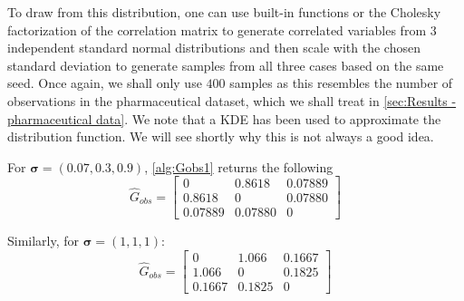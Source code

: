 \documentclass[../Thesis.tex]{subfiles}
\begin{document}

To draw from this distribution, one can use built-in functions or the Cholesky factorization of the correlation matrix to generate correlated variables from $3$ independent standard normal distributions and then scale with the chosen standard deviation to generate samples from all three cases based on the same seed. Once again, we shall only use $400$ samples as this resembles the number of observations in the pharmaceutical dataset, which we shall treat in \autoref{sec:Results - pharmaceutical data}. We note that a KDE has been used to approximate the distribution function. We will see shortly why this is not always a good idea.


For $\boldsymbol\sigma = (0.07, 0.3, 0.9)$, \autoref{alg:Gobs1} returns the following
\begin{equation} \label{eq:s small G_dir}
    \hat{G}_{obs} =
    \begin{bmatrix}
        0       & 0.8618  & 0.07889 \\
        0.8618  & 0       & 0.07880 \\
        0.07889 & 0.07880 & 0
    \end{bmatrix}
\end{equation}


Similarly, for $\boldsymbol\sigma = (1,1,1)$:
\begin{equation} \label{eq:s medium G_dir}
    \hat{G}_{obs} =
    \begin{bmatrix}
        0      & 1.066  & 0.1667 \\
        1.066  & 0      & 0.1825 \\
        0.1667 & 0.1825 & 0
    \end{bmatrix}
\end{equation}
\end{document}
